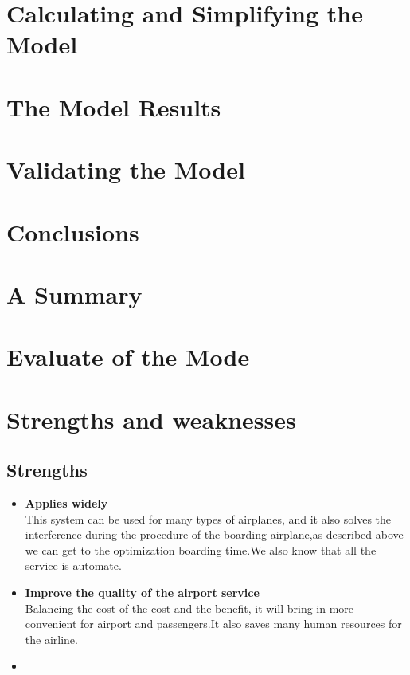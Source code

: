 \documentclass{mcmthesis}
\begin{document}
\section{Calculating and Simplifying the Model  }
\lipsum[11]

\section{The Model Results}
\lipsum[6]

\section{Validating the Model}
\lipsum[9]

\section{Conclusions}
\lipsum[6]

\section{A Summary}
\lipsum[6]

\section{Evaluate of the Mode}

\section{Strengths and weaknesses}
\lipsum[12]

\subsection{Strengths}
\begin{itemize}
  \item \textbf{Applies widely}\\
        This  system can be used for many types of airplanes, and it also
        solves the interference during  the procedure of the boarding
        airplane,as described above we can get to the  optimization
        boarding time.We also know that all the service is automate.
  \item \textbf{Improve the quality of the airport service}\\
        Balancing the cost of the cost and the benefit, it will bring in
        more convenient  for airport and passengers.It also saves many
        human resources for the airline. \item \textbf{}
\end{itemize}
\end{document}
